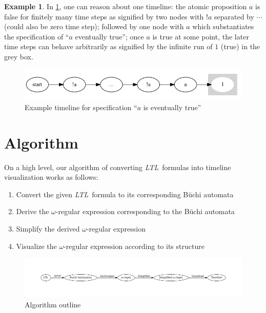 \documentclass[preprint,12pt]{elsarticle}
\theoremstyle{definition}
\newtheorem{example}{Example}[section]
\theoremstyle{remark}
\newcommand{\ltl}{\textit{LTL}}
\newcommand{\Buchi}{B\"{u}chi }
\begin{document}
\begin{example}
    In \cref{fig:ex15}, one can reason about one timeline: the atomic proposition $a$ is false for finitely many time steps as signified by two nodes with $!a$ separated by $\cdots$ (could also be zero time step); followed by one node with $a$ which substantiates the specification of ``$a$ eventually true''; once $a$ is true at some point, the later time steps can behave arbitrarily as signified by the infinite run of $1$ (true) in the grey box.
    \begin{figure}[!h]
        \centering
        \includegraphics[scale=0.4]{examples/ex15/ex15.png}
        \caption{Example timeline for specification ``$a$ is eventually true''}
        \label{fig:ex15}
    \end{figure}
\end{example}

\section{Algorithm}
On a high level, our algorithm of converting \ltl\ formulas into timeline visualization works as follows:
\begin{enumerate}
    \item Convert the given \ltl\ formula to its corresponding \Buchi automata %
    \item Derive the $\omega$-regular expression corresponding to the \Buchi automata %
    \item Simplify the derived $\omega$-regular expression %
    \item Visualize the $\omega$-regular expression according to its structure %
\end{enumerate}
\begin{figure}[!h]
    \centering
    \includegraphics[width=\textwidth]{img/algorithm_outline.pdf}
    \caption{Algorithm outline}
    \label{fig:algo}
\end{figure}
\end{document}
